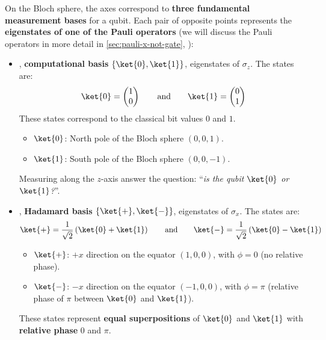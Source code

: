\noindent
On the Bloch sphere, the axes correspond to \textbf{three fundamental measurement bases} for a qubit. Each pair of opposite points represents the \textbf{eigenstates of one of the Pauli operators} (we will discuss the Pauli operators in more detail in \ref{sec:pauli-x-not-gate}, ):
\begin{itemize}
    \item {}, \textbf{computational basis} $\{\ket{0}, \ket{1}\}$, eigenstates of $\sigma_{z}$. The states are:
    \begin{equation*}
        \ket{0} = \begin{pmatrix}
            1 \\ 0
        \end{pmatrix}
        \hspace{2em} \text{and} \hspace{2em}
        \ket{1} = \begin{pmatrix}
            0 \\ 1
        \end{pmatrix}
    \end{equation*}
    These states correspond to the classical bit values $0$ and $1$.
    \begin{itemize}
        \item $\ket{0}$: North pole of the Bloch sphere $\left(0, 0, 1\right)$.
        \item $\ket{1}$: South pole of the Bloch sphere $\left(0, 0, -1\right)$.
    \end{itemize}
    Measuring along the $z$-axis answer the question: ``\emph{is the qubit $\ket{0}$ or $\ket{1}$?}''.


    \item {}, \textbf{Hadamard basis} $\{\ket{+}, \ket{-}\}$, eigenstates of $\sigma_{x}$. The states are:
    \begin{equation*}
        \ket{+} = \dfrac{1}{\sqrt{2}}\left(\ket{0} + \ket{1}\right)
        \hspace{2em} \text{and} \hspace{2em}
        \ket{-} = \dfrac{1}{\sqrt{2}}\left(\ket{0} - \ket{1}\right)
    \end{equation*}
    \begin{itemize}
        \item $\ket{+}$: $+x$ direction on the equator $\left(1, 0, 0\right)$, with $\phi = 0$ (no relative phase).
        \item $\ket{-}$: $-x$ direction on the equator $\left(-1, 0, 0\right)$, with $\phi = \pi$ (relative phase of $\pi$ between $\ket{0}$ and $\ket{1}$).
    \end{itemize}
    These states represent \textbf{equal superpositions} of $\ket{0}$ and $\ket{1}$ with \textbf{relative phase} $0$ and $\pi$.



\end{itemize}

